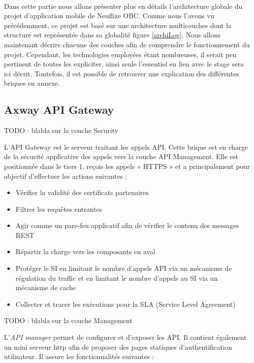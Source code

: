 \paragraph{}
Dans cette partie nous allons présenter plus en détails l'architecture globale du projet d'application mobile de Neuflize OBC. Comme nous l'avons vu précédemment, ce projet est basé sur une architecture multicouches dont la structure est représentée dans sa globalité figure \ref{archiLog}. Nous allons maintenant décrire chacune des couches afin de comprendre le fonctionnement du projet. Cependant, les technologies employées étant nombreuses, il serait peu pertinent de toutes les expliciter, ainsi seule l'essentiel en lien avec le stage sera ici décrit. Toutefois, il est possible de retrouver une explication des différentes briques en annexe.

\subsection{Axway API Gateway}
\label{axway}
	TODO : blabla sur la couche Security
		
	L'API Gateway est le serveur traitant les appels API. Cette brique est en charge de la sécurité applicative des appels vers la couche API Management. Elle est positionnée dans le tiers 1, reçois les appels « HTTPS » et a principalement pour objectif d’effectuer les actions suivantes : \\
	
	\begin{itemize}
		\item Vérifier la validité des certificats partenaires
		\item Filtrer les requêtes entrantes 
		\item Agir comme un pare-feu applicatif afin de vérifier le contenu des messages REST
		\item Répartir la charge vers les composants en aval
		\item Protéger le SI en limitant le nombre d’appels API via un mécanisme de régulation du traffic et en limitant le nombre d'appels au SI via un mécanisme de cache
		\item Collecter et tracer les exécutions pour la SLA (Service Level Agreement) \\
	\end{itemize}
	
	
	TODO : blabla sur la couche Management
	
	L'\textit{API manager} permet de configurer et d’exposer les API. Il contient également un mini serveur http afin de proposer des pages statiques d’authentification utilisateur. Il assure les fonctionnalités suivantes : \\
	
